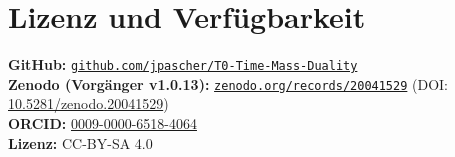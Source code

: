 \section*{Lizenz und Verfügbarkeit}

\textbf{GitHub:} \href{https://github.com/jpascher/T0-Time-Mass-Duality}{\texttt{github.com/jpascher/T0-Time-Mass-Duality}}\\
\textbf{Zenodo (Vorgänger v1.0.13):} \href{https://zenodo.org/records/20041529}{\texttt{zenodo.org/records/20041529}} (DOI: \href{https://doi.org/10.5281/zenodo.20041529}{10.5281/zenodo.20041529})\\
\textbf{ORCID:} \href{https://orcid.org/0009-0000-6518-4064}{0009-0000-6518-4064}\\
\textbf{Lizenz:} CC-BY-SA 4.0
